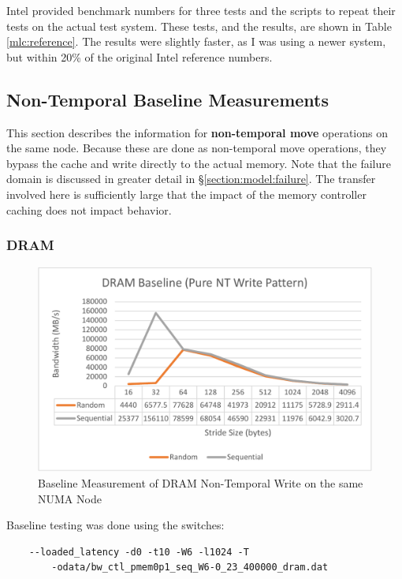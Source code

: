 Intel provided benchmark numbers for three tests and the scripts to repeat their tests
on the actual test system. These tests, and the results, are shown in Table \ref{mlc:reference}.
The results were slightly faster, as I was using a newer system, but within 20\% of the original
Intel reference numbers.

\subsection{Non-Temporal Baseline Measurements}


This section describes the information for \textbf{non-temporal move} operations on the same node. Because
these are done as non-temporal move operations, they bypass the cache and write directly to the actual
memory.  Note that the failure domain is discussed in greater detail in \S \ref{section:model:failure}.
The transfer involved here is sufficiently large that the impact of the memory controller caching
does not impact behavior.

\subsubsection{DRAM}\label{baseline:dram}

\begin{figure}
    \centering
    \caption{Baseline Measurement of DRAM Non-Temporal Write on the same NUMA Node}\label{chart:baseline:dram}
    \includegraphics[width=1\textwidth]{charts/dram-baseline-nt-write-same-node-crop.pdf}
\end{figure}

Baseline testing was done using the switches:

\begin{verbatim}
    --loaded_latency -d0 -t10 -W6 -l1024 -T 
        -odata/bw_ctl_pmem0p1_seq_W6-0_23_400000_dram.dat
\end{verbatim}

